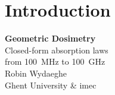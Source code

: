 
\section{Introduction}

\begin{frame}[plain]
  \vfill
  \begin{center}
    {\Large\color{navyblue}\bfseries Geometric Dosimetry}\\[8pt]
    {\normalsize Closed-form absorption laws\\
     from \SI{100}{\mega\hertz} to \SI{100}{\giga\hertz}}\\[16pt]
    {\small Robin Wydaeghe}\\[2pt]
    {\footnotesize Ghent University \& imec}
  \end{center}
  \vfill
\end{frame}

